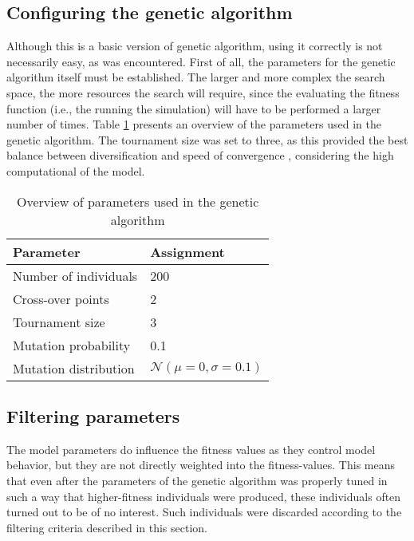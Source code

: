 \subsection{Configuring the genetic algorithm}\label{section:ga_parameters}
Although this is a basic version of genetic algorithm, using it correctly is not necessarily easy, as was encountered. First of all, the parameters for the genetic algorithm itself must be established. The larger and more complex the search space, the more resources the search will require, since the evaluating the fitness function (i.e., the running the simulation) will have to be performed a larger number of times. Table \ref{table:genetic_algorithm_parameters} presents an overview of the parameters used in the genetic algorithm. The tournament size was set to three, as this provided the best balance between diversification and speed of convergence \cite{blickle1995comparisonkeylist, goldberg1991comparative}, considering the high computational  of the model.

\begin{table}
	\centering
	\begin{tabular}{l|l}
		Parameter & Assignment\\\hline
		Number of individuals & 200\\
		Cross-over points & 2\\
		Tournament size & 3\\
		Mutation probability & 0.1\\
		Mutation distribution &  $\mathcal{N}(\mu = 0, \sigma = 0.1)$\\
	\end{tabular}
	\caption{Overview of parameters used in the genetic algorithm}
	\label{table:genetic_algorithm_parameters}
\end{table}



\subsection{Filtering parameters}\label{section:filtering_parameters}

The model parameters do influence the fitness values as they control model behavior, but they are not directly weighted into the fitness-values. This means that even after the parameters of the genetic algorithm was properly tuned in such a way that higher-fitness individuals were produced, these individuals often turned out to be of no interest. Such individuals were discarded according to the filtering criteria described in this section.

